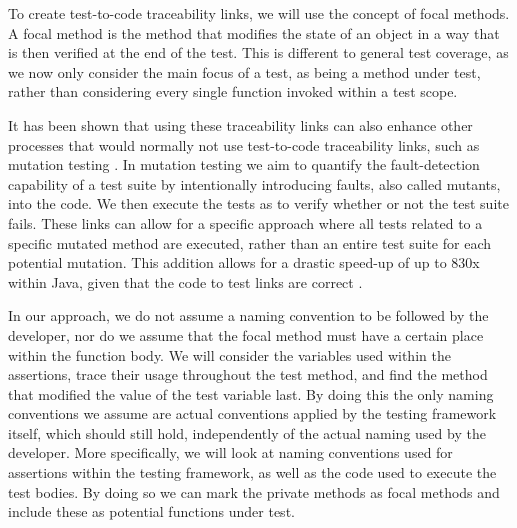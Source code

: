 \documentclass[11pt]{article}
\begin{document}
\begin{multicols}{2}
To create test-to-code traceability links, we will use the concept of focal methods. A focal method is the method that modifies the state of an object in a way that is then verified at the end of the test\cite{10.1145/3278186.3278190}. This is different to general test coverage, as we now only consider the main focus of a test, as being a method under test, rather than considering every single function invoked within a test scope.

It has been shown that using these traceability links can also enhance other processes that would normally not use test-to-code traceability links, such as mutation testing \cite{10.1145/3278186.3278190}. In mutation testing we aim to quantify the fault-detection capability of a test suite by intentionally introducing faults, also called mutants, into the code. We then execute the tests as to verify whether or not the test suite fails. These links can allow for a specific approach where all tests related to a specific mutated method are executed, rather than an entire test suite for each potential mutation. This addition allows for a drastic speed-up of up to 830x within Java, given that the code to test links are correct \cite{10.1145/3278186.3278190}.

In our approach, we do not assume a naming convention to be followed by the developer, nor do we assume that the focal method must have a certain place within the function body. We will consider the variables used within the assertions, trace their usage throughout the test method, and find the method that modified the value of the test variable last. By doing this the only naming conventions we assume are actual conventions applied by the testing framework itself, which should still hold, independently of the actual naming used by the developer. More specifically, we will look at naming conventions used for assertions within the testing framework, as well as the code used to execute the test bodies. By doing so we can mark the private methods as focal methods and include these as potential functions under test.


\end{multicols}
\end{document}

